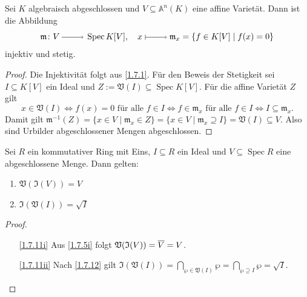 \documentclass[a4paper,12pt,index=toc]{scrbook}
\theoremstyle{keinenummern} %
\def\A{\mathbb{A}}
\def\V{\mathfrak{V}}
\def\I{\mathfrak{I}}
\def\m{\mathfrak{m}}
\newcommand{\Spec}{\operatorname{Spec}}
\def\Bar#1{\ensuremath\overline{#1}}
\begin{document}
\begin{prop}\label{1.7.10}
  Sei $K$ algebraisch abgeschlossen und $V\subseteq\A^n(K)$ eine affine Varietät. Dann ist die Abbildung
  \begin{equation*} \m\colon V\ra \Spec K[V], \quad x\mapsto \m_x=\{f\in K[V]\mid f(x)=0\} \end{equation*}
  injektiv und stetig.
\end{prop}
\begin{proof}
  Die Injektivität folgt aus \cref{1.7.1}. Für den Beweis der Stetigkeit sei $I\subseteq K[V]$ ein Ideal und
  $Z:=\V(I)\subseteq\Spec K[V]$. Für die affine
  Varietät $Z$ gilt
  \begin{equation*}x\in\V(I) \iff f(x)=0 \text{ für alle }f\in I \iff f\in \m_x \text{ für alle }f\in I \iff I\subseteq \m_x. \end{equation*}
  Damit gilt $\m^{-1}(Z)=\{x\in V\mid \m_x\in Z\}=\{x\in V\mid \m_x\supseteq I\}=\V(I)\subseteq V$. Also sind Urbilder
  abgeschlossener Mengen abgeschlossen.
\end{proof}

\begin{prop}\label{1.7.11}
  Sei $R$ ein kommutativer Ring mit Eins, $I\subseteq R$ ein Ideal und $V\subseteq\Spec R$ eine abgeschlossene Menge. Dann
  gelten:
  \begin{enumerate}
  \item{} $\V(\I(V))=V$
  \item{} $\I(\V(I))=\sqrt{I}$
  \end{enumerate}
\end{prop}
\begin{proof}
  \begin{enumerate}
  \item[\ref{1.7.11i}] Aus \cref{1.7.5i} folgt $\V(\I(V))=\Bar{V}=V$.
  \item[\ref{1.7.11ii}] Nach \cref{1.7.12} gilt $\displaystyle\I(\V(I))=\!\!\bigcap_{\wp\in\V(I)}\!\!\wp=\bigcap_{\wp\supseteq I}\wp=\sqrt{I}$.
  \end{enumerate}
\end{proof}
\end{document}
